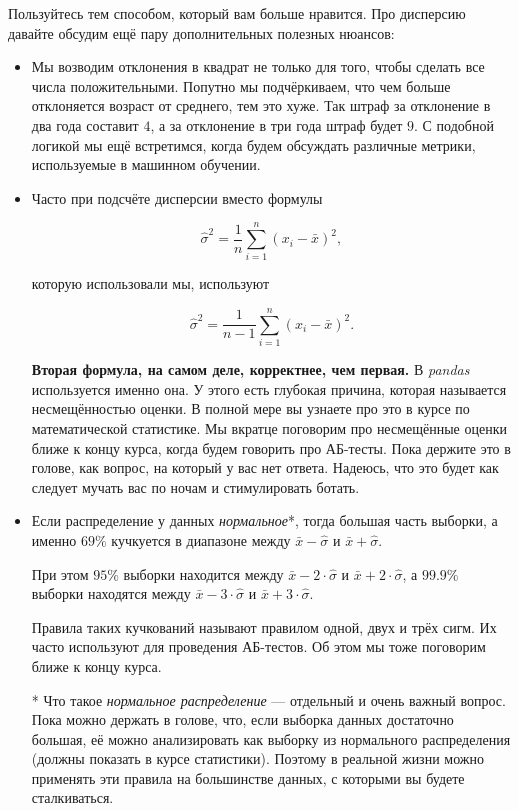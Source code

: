\documentclass[12pt, a4paper, oneside]{article}
\theoremstyle{plain} %
\theoremstyle{definition}
\newcommand{\indef}[1]{\textbf{ \color{green} #1}}
\begin{document}
\begin{solution}
\begin{enumerate}
	Пользуйтесь тем способом, который вам больше нравится. Про дисперсию давайте обсудим ещё пару дополнительных полезных нюансов: 
	
	\begin{itemize}
		\item  Мы возводим отклонения в квадрат не только для того, чтобы сделать все числа положительными. Попутно мы подчёркиваем, что чем больше отклоняется возраст от среднего, тем это хуже. Так штраф за отклонение в два года составит $4$, а за отклонение в три года штраф будет $9$.  С подобной логикой мы ещё встретимся, когда будем обсуждать различные метрики, используемые в машинном обучении. 
		
		\item Часто при подсчёте дисперсии вместо формулы 
		
		\[ 
		\hat \sigma^2 = \frac{1}{n} \sum_{i=1}^n (x_i - \bar x)^2,
		\]
		
		которую использовали мы, используют 
		
		\[ 
		\hat \sigma^2 = \frac{1}{n-1} \sum_{i=1}^n (x_i - \bar x)^2.
		\]
		
		\indef{Вторая формула, на самом деле, корректнее, чем первая.} В \textit{pandas} используется именно она. У этого есть глубокая причина, которая называется несмещённостью оценки. В полной мере вы узнаете про это в курсе по математической статистике. Мы вкратце поговорим про несмещённые оценки ближе к концу курса, когда будем говорить про АБ-тесты. Пока держите это в голове, как вопрос, на который у вас нет ответа. Надеюсь, что это будет как следует мучать вас по ночам и стимулировать ботать. 
	
		\item Если распределение у данных \textit{нормальное}*, тогда  большая часть выборки, а именно $69\%$ кучкуется в диапазоне между $\bar x - \hat \sigma$ и $\bar x + \hat \sigma$.  
		
		При этом $95 \%$ выборки находится между $\bar x - 2 \cdot \hat \sigma$ и $\bar x + 2 \cdot \hat \sigma$, а $99.9\%$ выборки находятся между $\bar x - 3 \cdot \hat \sigma$ и $\bar x + 3 \cdot \hat \sigma$. 
		
		Правила таких кучкований называют правилом одной, двух и трёх сигм. Их часто используют для проведения АБ-тестов. Об этом мы тоже поговорим ближе к концу курса.

		* Что такое \textit{нормальное распределение} --- отдельный и очень важный вопрос. Пока можно держать в голове, что, если выборка данных достаточно большая, её можно анализировать как выборку из нормального распределения (должны показать в курсе статистики). Поэтому в реальной жизни можно применять эти правила на большинстве данных, с которыми вы будете сталкиваться.
	\end{itemize}
	

\end{enumerate}
\end{solution}
\end{document}
